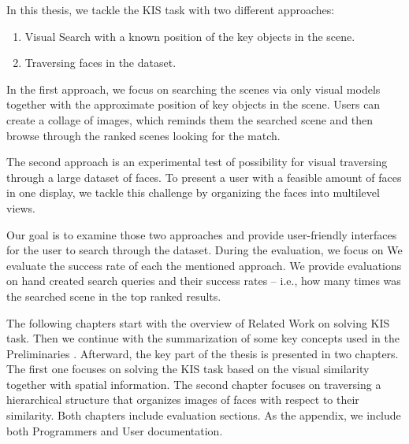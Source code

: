 In this thesis, we tackle the KIS task with two different approaches: 
\begin{enumerate}
  \item Visual Search with a known position of the key objects in the scene.
  \item Traversing faces in the dataset.
\end{enumerate}

In the first approach, we focus on searching the scenes via only visual models together with the approximate position of key objects in the scene. Users can create a collage of images, which reminds them the searched scene and then browse through the ranked scenes looking for the match.

The second approach is an experimental test of possibility for visual traversing through a large dataset of faces. To present a user with a feasible amount of faces in one display, we tackle this challenge by organizing the faces into multilevel views.

Our goal is to examine those two approaches and provide user-friendly interfaces for the user to search through the dataset. During the evaluation, we focus on We evaluate the success rate of each the mentioned approach. We provide evaluations on hand created search queries and their success rates -- i.e., how many times was the searched scene in the top ranked results.

The following chapters start with the overview of Related Work on solving KIS task. Then we continue with the summarization of some key concepts used in the Preliminaries . Afterward, the key part of the thesis is presented in two chapters. The first one focuses on solving the KIS task based on the visual similarity together with spatial information. The second chapter focuses on traversing a hierarchical structure that organizes images of faces with respect to their similarity. Both chapters include evaluation sections. As the appendix, we include both Programmers and User documentation.
